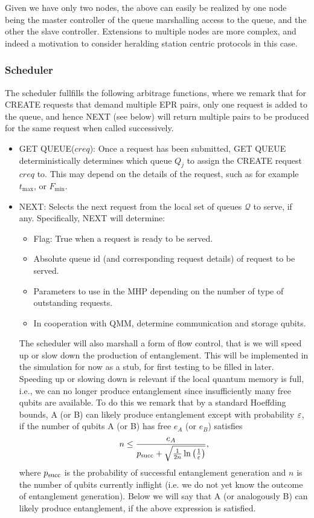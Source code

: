 \documentclass{article}
\begin{document}
Given we have only two nodes, the above can easily be realized by one node being the master controller of the queue marshalling access to the queue, and the other the slave controller. Extensions to multiple nodes are more complex, and indeed a motivation to consider heralding station centric protocols in this case.

\subsubsection{Scheduler}
The scheduler fullfills the
following arbitrage functions, where we remark that 
for CREATE requests that demand multiple EPR pairs, only one request is added to the queue, and hence NEXT 
(see below) will return multiple pairs
to be produced for the same request when called successively.
\begin{itemize}
\item GET QUEUE($creq$): Once a request has been submitted, GET QUEUE deterministically determines which queue $Q_j$ to 
assign the CREATE request $creq$ to. This may depend
on the details of the request, such as for example $t_{\max}$, or $F_{\min}$.
\item NEXT: Selects the next request from the local set of queues $\mathcal{Q}$ to serve, if any. Specifically, NEXT will determine:
\begin{itemize}
\item Flag: True when a request is ready to be served.
\item Absolute queue id (and corresponding request details) of request to be served. 
\item Parameters to use in the MHP depending on the number of type of outstanding requests.
\item In cooperation with QMM, determine communication and storage qubits.
\end{itemize}
The scheduler will also marshall a form of flow control, that is we will speed up or slow down the production of entanglement. This will be implemented in the simulation for now as a stub, for first testing to be filled in later. Speeding up or slowing down is relevant if the local quantum memory is full, i.e., we can no longer produce entanglement since insufficiently many free qubits are available.  To do this we remark that by a standard Hoeffding bounds, A (or B) can likely produce entanglement except with probability $\varepsilon$, if the number of qubits A (or B) has free $e_A$ (or $e_B$) satisfies
\begin{align}
n \leq \frac{e_A}{p_{\rm succ} + \sqrt{\frac{1}{2n} \ln\left(\frac{1}{\varepsilon}\right)}}, 
\end{align}
where $p_{\rm succ}$ is the probability of successful entanglement generation and $n$ is the number of qubits currently inflight (i.e. we do not yet
know the outcome of entanglement generation). 
Below we will say that A (or analogously B) can likely produce entanglement, if the above expression is satisfied.
\end{itemize}
\end{document}
